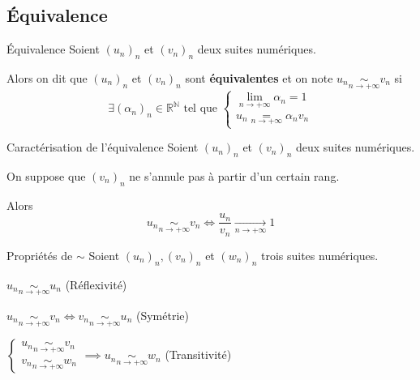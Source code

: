\subsection{Équivalence}

    \begin{defi}{Équivalence}{}
        Soient $(u_n)_n$ et $(v_n)_n$ deux suites numériques.
    
        Alors on dit que $(u_n)_n$ et $(v_n)_n$ sont \textbf{équivalentes} et on note $u_n \underset{n \rightarrow +\infty}{\sim} v_n$ si
        \[ \exists (\alpha_n)_n \in \mathbb{R}^{\mathbb{N}} \text{ tel que } \left\{ \begin{array}{ll}
        \underset{n \rightarrow + \infty}{\lim} \alpha_n = 1 \\
        u_n \underset{n \rightarrow +\infty}{=} \alpha_n v_n
        \end{array} \right. \]
    \end{defi}
    
    \begin{theo}{Caractérisation de l’équivalence}{}
        Soient $(u_n)_n$ et $(v_n)_n$ deux suites numériques.
    
        On suppose que $(v_n)_n$ ne s’annule pas à partir d’un certain rang.
    
        Alors \[ u_n \underset{n \rightarrow +\infty}{\sim} v_n \iff \frac{u_n}{v_n} \underset{n \rightarrow +\infty}{\longrightarrow} 1 \]
    \end{theo}

    \begin{prop}{Propriétés de $\sim$}{}
        Soient $(u_n)_n, (v_n)_n$ et $(w_n)_n$ trois suites numériques.
    
        \begin{alors}
            \item $ u_n \underset{n \rightarrow +\infty}{\sim} u_n$ (Réflexivité)  \item $ u_n \underset{n \rightarrow +\infty}{\sim} v_n \iff v_n  \underset{n \rightarrow +\infty}{\sim} u_n$ (Symétrie)
            \item $\left\{ \begin{array}{l}
                u_n \underset{n \rightarrow +\infty}{\sim} v_n \\
                v_n \underset{n \rightarrow +\infty}{\sim} w_n
            \end{array} \right. \implies u_n \underset{n \rightarrow +\infty}{\sim} w_n$ (Transitivité)
        \end{alors}
    \end{prop}
    
